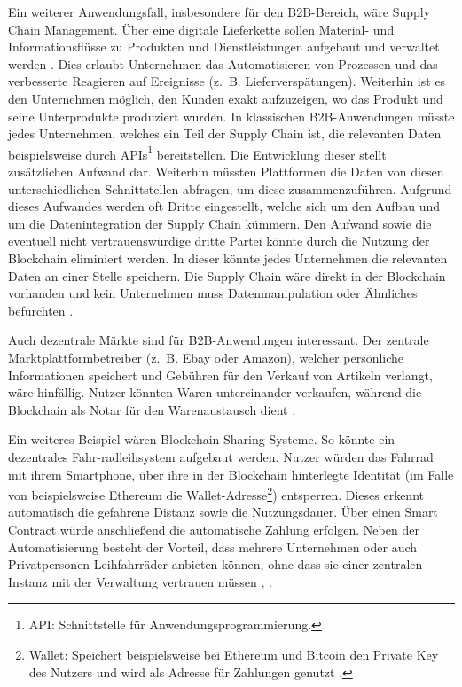 Ein weiterer Anwendungsfall, insbesondere für den \acs{B2B}-Bereich, wäre Supply Chain Management. Über eine digitale Lieferkette sollen Material- und Informationsflüsse zu Produkten und Dienstleistungen aufgebaut und verwaltet werden \cite{KriegerSupplyChainManagement}. Dies erlaubt Unternehmen das Automatisieren von Prozessen und das verbesserte Reagieren auf Ereignisse (z.~B. Lieferverspätungen). Weiterhin ist es den Unternehmen möglich, den Kunden exakt aufzuzeigen, wo das Produkt und seine Unterprodukte produziert wurden. In klassischen \acs{B2B}-Anwendungen müsste jedes Unternehmen, welches ein Teil der Supply Chain ist, die relevanten Daten beispielsweise durch APIs\footnote{API: Schnittstelle für Anwendungsprogrammierung\cite{DigHowAPIsevolve2006}.} bereitstellen. Die Entwicklung dieser stellt zusätzlichen Aufwand dar. Weiterhin müssten Plattformen die Daten von diesen unterschiedlichen Schnittstellen abfragen, um diese zusammenzuführen. Aufgrund dieses Aufwandes werden oft Dritte eingestellt, welche sich um den Aufbau und um die Datenintegration der Supply Chain kümmern. Den Aufwand sowie die eventuell nicht vertrauenswürdige dritte Partei könnte durch die Nutzung der Blockchain eliminiert werden. In dieser könnte jedes Unternehmen die relevanten Daten an einer Stelle speichern. Die Supply Chain wäre direkt in der Blockchain vorhanden und kein Unternehmen muss Datenmanipulation oder Ähnliches befürchten \cite{KorpelaDigitalSupplyChain2017}.

Auch dezentrale Märkte sind für \acs{B2B}-Anwendungen interessant. Der zentrale Marktplattformbetreiber (z.~B. Ebay oder Amazon), welcher persönliche Informationen speichert und Gebühren für den Verkauf von Artikeln verlangt, wäre hinfällig. Nutzer könnten Waren untereinander verkaufen, während die Blockchain als Notar für den Warenaustausch dient \cite{BenHamidaBlockchainEnterpriseOverview2017}.

Ein weiteres Beispiel wären Blockchain Sharing-Systeme. So könnte ein dezentrales Fahr-radleihsystem aufgebaut werden. Nutzer würden das Fahrrad mit ihrem Smartphone, über ihre in der Blockchain hinterlegte Identität (im Falle von beispielsweise Ethereum die Wallet-Adresse\footnote{Wallet: Speichert beispielsweise bei Ethereum und Bitcoin den Private Key des Nutzers und wird als Adresse für Zahlungen genutzt \cite[S.~61 ff.]{AntonopoulosMasteringbitcoin2015}.}) entsperren. Dieses erkennt automatisch die gefahrene Distanz sowie die Nutzungsdauer. Über einen Smart Contract würde anschließend die automatische Zahlung erfolgen. Neben der Automatisierung besteht der Vorteil, dass mehrere Unternehmen oder auch Privatpersonen Leihfahrräder anbieten können, ohne dass sie einer zentralen Instanz mit der Verwaltung vertrauen müssen \cite{FutureFluxFestivalBlockchainBikes}, \cite{FischerIoTBlockchain}.


